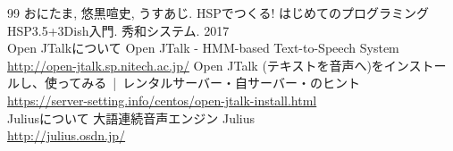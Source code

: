 \documentclass[a4paper,12pt]{ltjsbook}
\begin{document}
  
  \begin{thebibliography}{99}
   おにたま, 悠黒喧史, うすあじ. HSPでつくる! はじめてのプログラミング HSP3.5+3Dish入門. 秀和システム. 2017
  \\ Open JTalkについて
   Open JTalk - HMM-based Text-to-Speech System \\ \url{http://open-jtalk.sp.nitech.ac.jp/}
   Open JTalk (テキストを音声へ)をインストールし、使ってみる | レンタルサーバー・自サーバー・のヒント \\ \url{https://server-setting.info/centos/open-jtalk-install.html}
  \\ Juliusについて
 大語連続音声エンジン Julius \\ \url{http://julius.osdn.jp/}
  \end{thebibliography}
\end{document}
